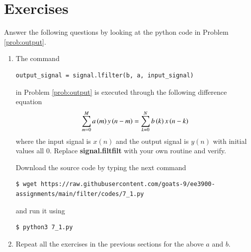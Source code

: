 \documentclass[journal,12pt,twocolumn]{IEEEtran}
\renewcommand\thesection{\arabic{section}}
\begin{document}
\section{Exercises}
\noindent Answer the following questions by looking at the python code in Problem \ref{prob:output}.
\begin{enumerate}[label=\thesection.\arabic*]
\item
The command
\begin{lstlisting}
output_signal = signal.lfilter(b, a, input_signal)
\end{lstlisting}
in Problem \ref{prob:output} is executed through the following difference equation
\begin{equation}
\label{eq:iir_filter_gen}
 \sum _{m=0}^{M}a\left(m\right)y\left(n-m\right)=\sum _{k=0}^{N}b\left(k\right)x\left(n-k\right)
\end{equation}
where the input signal is $x(n)$ and the output signal is $y(n)$ with initial values all 0. Replace
\textbf{signal.filtfilt} with your own routine and verify.

\solution
Download the source code by typing the next command \\
\begin{lstlisting}
$ wget https://raw.githubusercontent.com/goats-9/ee3900-assignments/main/filter/codes/7_1.py
\end{lstlisting}
and run it using
\begin{lstlisting}
$ python3 7_1.py
\end{lstlisting}
\item Repeat all the exercises in the previous sections for the above $a$ and $b$.


\end{enumerate}
\end{document}
